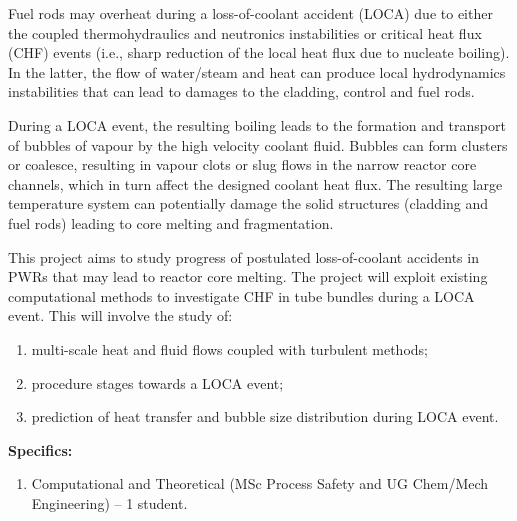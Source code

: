 \documentclass[12pts,a4paper,amsmath,amssymb,floatfix]{article}%
\newcommand{\Chem}{UG Chem/Mech Engineering}
\begin{document}
\begin{enumerate}[label=\bfseries Project: \arabic*:]
  Fuel rods may overheat during a loss-of-coolant accident (LOCA) due to either the coupled thermohydraulics and neutronics instabilities or critical heat flux (CHF) events (i.e., sharp reduction of the local heat flux due to nucleate boiling). In the latter, the flow of water/steam and heat can produce local hydrodynamics instabilities that can lead to damages to the cladding, control and fuel rods.

  During a LOCA event, the resulting boiling leads to the formation and transport of bubbles of vapour by the high velocity coolant fluid. Bubbles can form clusters or coalesce, resulting in vapour clots or slug flows in the narrow reactor core channels, which in turn affect the designed coolant heat flux. The resulting large temperature system can potentially damage the solid structures (cladding and fuel rods) leading to core melting and fragmentation.
  
  This project aims to study progress of postulated loss-of-coolant accidents in PWRs that may lead to reactor core melting. The project will exploit existing computational methods to investigate CHF in tube bundles during a LOCA event. This will involve the study of:
  \begin{enumerate} 
    \item multi-scale heat and fluid flows coupled with turbulent methods;
    \item procedure stages towards a LOCA event;
    \item prediction of heat transfer and bubble size distribution during LOCA event.
  \end{enumerate}
  

 
\noindent
{\bf Specifics:} 
\begin{enumerate}
\item Computational and Theoretical (MSc Process Safety and \Chem) -- 1 student.
\end{enumerate}


\end{enumerate}
\end{document}
